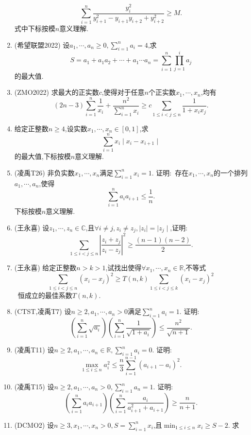 \documentclass{article}
\begin{document}
\begin{enumerate}
            $$\sum_{i=1}^n{\frac{y_i^2}{y_{i+1}^2-y_{i+1}y_{i+2}+y_{i+2}^2}}\geq M.$$
            式中下标按模$n$意义理解.
        \item (希望联盟2022) 设$a_1,\cdots,a_n\ge0,\sum_{i=1}^n{a_i}=4$,求\ 
            $$S=a_1+a_1a_2+\cdots+a_1\cdots a_n=\sum_{i=1}^n{\prod_{j=1}^i{a_j}}$$的最大值.
        \item (ZMO2022) 求最大的正实数$c$,使得对于任意$n$个正实数$x_1,\cdots,x_n$,均有\
            $$(2n-3)\sum_{i=1}^n{\frac{1}{x_i}}+\frac{n^2}{\sum_{i=1}^n{x_i}}\geq c\sum_{1\le i<j \le n}{\frac{1}{1+x_ix_j}}.$$
        \item 给定正整数$n\ge4$,设实数$x_1,\cdots,x_n\in[0,1]$,求\ 
            $$\sum_{i=1}^n{x_i\mid x_i - x_{i+1} \mid}$$的最大值,下标按模$n$意义理解.
        \item (凌禹T26) 非负实数$x_1,\cdots,x_n$满足$\sum_{i=1}^n{x_i}=1$. 证明:\ 
            存在$x_1,\cdots,x_n$的一个排列$a_1,\cdots,a_n$,使得$$\sum_{i=1}^n{a_ia_{i+1}}\leq\frac{1}{n}.$$下标按模$n$意义理解.
        \item (王永喜) 设$z_1,\cdots,z_n\in\mathbb{C}$,且$\forall i \neq j, z_i\neq z_j, \mid z_i \mid = \mid z_j \mid$,证明: \ 
            $$\sum_{1\le i<j \le n} {{\left| \frac{z_i+z_j}{z_i-z_j} \right|}^2}\geq\frac{(n-1)(n-2)}{2}.$$
        \item (王永喜) 给定正整数$n>k>1$,试找出使得$\forall x_1,\cdots,x_n\in\mathbb{R}$,不等式\ 
            $$\sum_{1\le i<j \le n}{{\left( x_i-x_j \right)}^2}\geq T(n,k)\sum_{1 \le i<j \le k}{{\left( x_i-x_j \right)}^2}$$ \ 
            恒成立的最佳系数$T(n,k)$.
        \item (CTST,凌禹T7) 设$n\geq2,a_1,\cdots,a_n>0$满足$\sum_{i=1}^n{a_i}=1$. 证明: \ 
            $${\left( \sum_{i=1}^n{\sqrt{a_i}} \right)}{\left( \sum_{i=1}^n{\frac{1}{\sqrt{1+a_i}}} \right)}\leq\frac{n^2}{\sqrt{n+1}}.$$
        \item (凌禹T11) 设$n\geq2,a_1,\cdots,a_n\in\mathbb{R},\sum_{i=1}^n{a_i}=0$. 证明: \ 
            $$\max_{1\le i \le n}{a_i^2}\leq\frac{n}{3}\sum_{i=1}^{n-1}{(a_{i+1}-a_i)^2}.$$
        \item (凌禹T15) 设$n\geq2,a_1,\cdots,a_n>0,\sum_{i=1}^n{a_n}=1$. 证明: \ 
            $${\left( \sum_{i=1}^n{a_ia_{i+1}} \right)}{\left( \sum_{i=1}^n{\frac{a_i}{a_{i+1}^2+a_{i+1}}}\right)}\geq\frac{n}{n+1}.$$
        \item (DCMO2) 设$n\geq3,x_1,\cdots,x_n>0,S=\sum_{i=1}^n{x_i}$,且$\min_{1\le i \le n}{x_i}\geq S-2$. 求\ 

\end{enumerate}
\end{document}
